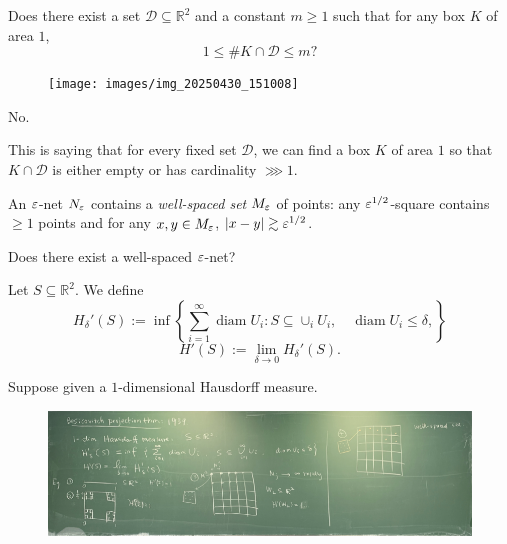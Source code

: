 \documentclass[reqno]{amsart} 
\numberwithin{theorem}{section}
\numberwithin{equation}{section}
\begin{document}
\begin{question}
  Does there exist a set $\mathcal{D} \subseteq \mathbb{R}^2$ and a constant $m \geq 1$ such that for any box $K$ of area $1$,
  \begin{equation*}
    1 \leq \# K \cap \mathcal{D} \leq m?
  \end{equation*}
\end{question}
\begin{figure}
  \centering \texttt{[image: images/img\_20250430\_151008]}
\end{figure}
\begin{answer}
  No.
\end{answer}
This is saying that for every fixed set $\mathcal{D}$, we can find a box $K$ of area $1$ so that $K \cap \mathcal{D}$ is either empty or has cardinality $\ggg 1$.

An $\varepsilon$-net $N_\varepsilon$ contains a \emph{well-spaced set} $M_\varepsilon$ of points: any $\varepsilon^{1/2}$-square contains $\geq 1$ points and for any $x, y \in M_\varepsilon$, $\lvert x - y \rvert \gtrsim \varepsilon^{1/2}$.
\begin{problem}
  Does there exist a well-spaced $\varepsilon$-net?
\end{problem}

Let $S \subseteq \mathbb{R}^2$.  We define
\begin{equation*}
  H_\delta '(S) := \inf \left\{ \sum_{i = 1}^\infty \operatorname{diam} U_i : S \subseteq \cup_i U_i,
    \quad
    \operatorname{diam} U_i \leq \delta,
  \right\}
\end{equation*}
\begin{equation*}
  H '(S) := \lim_{\delta \rightarrow 0} H_\delta '(S).
\end{equation*}

Suppose given a $1$-dimensional Hausdorff measure.
\begin{example}
  \begin{figure}
    \centering
    \includegraphics[width=1.0\textwidth]{images/img_20250430_151218}
  \end{figure}
\end{example}
\end{document}
